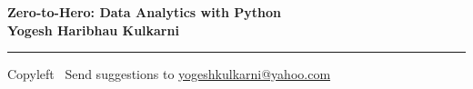 
\graphicspath{{images/}}

\footnotesize


\begin{center}
\Large{\textbf{Zero-to-Hero: Data Analytics with Python\\ Yogesh Haribhau Kulkarni}}  
\end{center}

\begin{multicols}{2}

\end{multicols}

\rule{\linewidth}{0.25pt}
\scriptsize
Copyleft \textcopyleft\  Send suggestions to 
\href{http://www.yogeshkulkarni.com}{yogeshkulkarni@yahoo.com}


